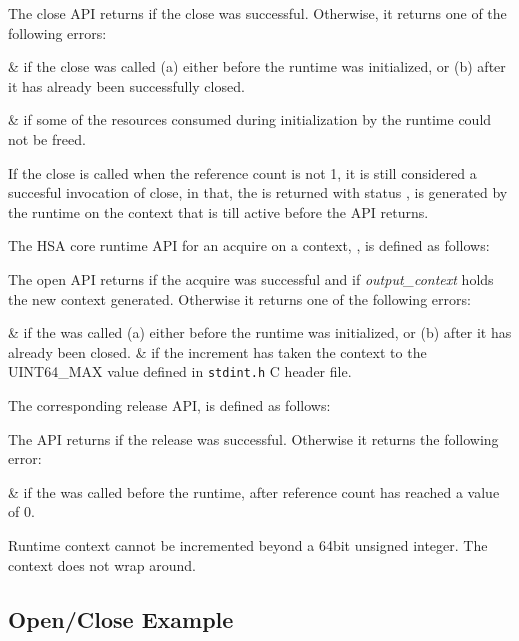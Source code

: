 

The close API returns  if the close
was successful. Otherwise, it returns one of the following errors:

\begin{easylist}
&  if the close was
called (a) either before the runtime was initialized, or (b)
after it has already been successfully closed.

&  if some of the
resources consumed during initialization by the runtime could not be
freed. 
\end{easylist}

If the close is called when the reference count is not 1, it is
still considered a succesful invocation of close, in that, the
 is returned with status
, is generated by the
runtime on the context that is till active before the API returns.

The HSA core runtime API for an acquire on a context,
, is defined as follows:



The open API returns  if the acquire was
successful and if {\itshape output\_context} holds the new context
generated. Otherwise it returns one of the following errors:

\begin{easylist}
&  if the
 was called (a) either before the
runtime was initialized, or (b) after it has already been
closed. 
&  if the increment has
taken the context to the UINT64\_MAX value defined in
\texttt{stdint.h} C header file.
\end{easylist}

The corresponding release API,  is
defined as follows:



The  API returns
 if the release was successful.
Otherwise it returns the following error:

\begin{easylist}
&  if the
 was called before the
runtime, after reference count has reached a value of 0.

Runtime context cannot be incremented beyond a 64bit unsigned
integer. The context does not wrap around.

\end{easylist}
\subsection{Open/Close Example}



